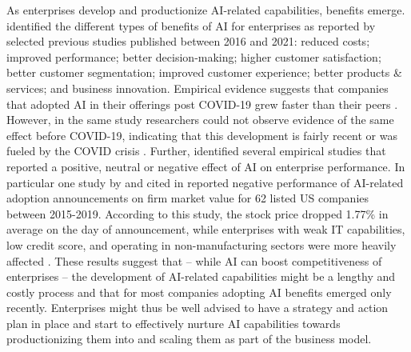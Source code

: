 As enterprises develop and productionize AI-related capabilities, benefits emerge. \cite{hoArtificialIntelligenceFirm2022} identified
the different types of benefits of AI for enterprises as reported by selected previous studies published between 2016 and 2021:
reduced costs; improved performance; better decision-making; higher customer satisfaction; better customer segmentation; improved
customer experience; better products \& services; and business innovation. Empirical evidence suggests that companies that adopted 
AI in their offerings post COVID-19 grew faster than their peers \citep{xuCanArtificialIntelligence2021}. However, in the same study
researchers could not observe evidence of the same effect before COVID-19, indicating that this development is fairly recent or was
fueled by the COVID crisis \citep{xuCanArtificialIntelligence2021}. Further, \cite{hoArtificialIntelligenceFirm2022} identified several
empirical studies that reported a positive, neutral or negative effect of AI on enterprise performance. In particular one study by
\cite{luiImpactArtificialIntelligence2022} and cited in \cite{hoArtificialIntelligenceFirm2022} reported negative performance of
AI-related adoption announcements on firm market value for 62 listed US companies between 2015-2019. According to this study, the
stock price dropped 1.77\% in average on the day of announcement, while enterprises with weak IT capabilities, low credit score,
and operating in non-manufacturing sectors were more heavily affected \citep{luiImpactArtificialIntelligence2022}. These results 
suggest that -- while AI can boost competitiveness of enterprises -- the development of AI-related capabilities might be a lengthy
and costly process and that for most companies adopting AI benefits emerged only recently. Enterprises might thus be well advised
to have a strategy and action plan in place and start to effectively nurture AI capabilities towards productionizing them into and
scaling them as part of the business model.


